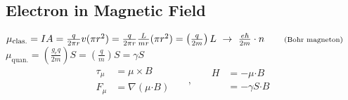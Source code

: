\documentclass[12pt]{article}
\newcommand{\dotP}{\boldsymbol \cdot}		%
\begin{document}
\vspace{15pt}
\subsection{Electron in Magnetic Field}

\vspace{10pt} \noindent
\(
    \mu_\text{clas.} = IA = \frac{q}{2 \pi r} v (\pi r^2) 
    = \frac{q}{2 \pi r} \frac{L}{m r} (\pi r^2) 
    = \left( \frac{q}{2m} \right) L 
    \ \rightarrow \ \frac{e\hbar}{2m} \cdot n 
    \hspace{20pt} \text{\scriptsize(Bohr magneton)}
\)\\[10pt]
\(
    \mu_\text{quan.} = \left( \frac{g_e q}{2m} \right) S = \left( \frac{q}{m} \right) S = \gamma S
\)
\[
    \begin{aligned}
        \tau_\mu &= \mu \times B \\[5pt]
        F_\mu &= \nabla(\mu \dotP B)
    \end{aligned}
    \hspace{18pt} , \hspace{18pt}\begin{aligned}
        H &= -\mu \dotP B \\[5pt]
        &= - \gamma S \dotP B
    \end{aligned}
\]
\end{document}
